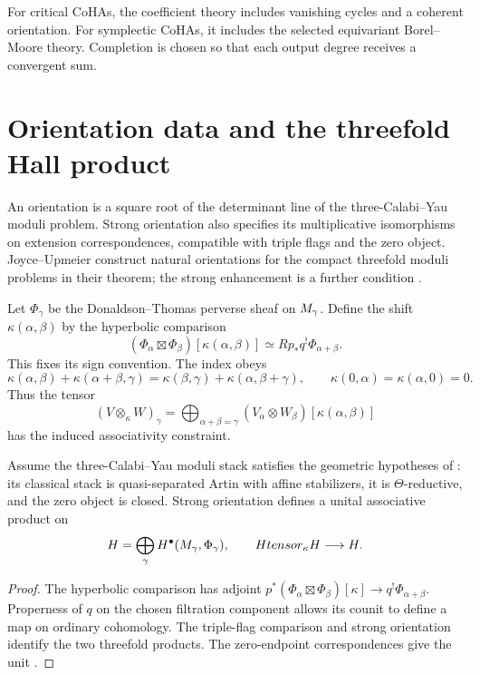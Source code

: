 For critical CoHAs, the coefficient theory includes vanishing cycles and a coherent orientation. For symplectic CoHAs, it includes the selected equivariant Borel--Moore theory. Completion is chosen so that each output degree receives a convergent sum.

\section{Orientation data and the threefold Hall product}
An orientation is a square root of the determinant line of the
three-Calabi--Yau moduli problem. Strong orientation also specifies its
multiplicative isomorphisms on extension correspondences, compatible
with triple flags and the zero object. Joyce--Upmeier construct natural
orientations for the compact threefold moduli problems in their theorem;
the strong enhancement is a further condition \cite{JoyceUpmeier,KPS}.

Let $\Phi_\gamma$ be the Donaldson--Thomas perverse sheaf on
$M_\gamma$. Define the shift $\kappa(\alpha,\beta)$ by the hyperbolic
comparison
\[
 (\Phi_\alpha\boxtimes\Phi_\beta)[\kappa(\alpha,\beta)]
       \simeq Rp_*q^!\Phi_{\alpha+\beta}.
\]
This fixes its sign convention. The index obeys
\[
 \kappa(\alpha,\beta)+\kappa(\alpha+\beta,\gamma)
 =\kappa(\beta,\gamma)+\kappa(\alpha,\beta+\gamma),
 \qquad \kappa(0,\alpha)=\kappa(\alpha,0)=0.
\]
Thus the tensor
\[
 (V\otimes_\kappa W)_\gamma
 =\bigoplus_{\alpha+\beta=\gamma}
       (V_\alpha\otimes W_\beta)[\kappa(\alpha,\beta)]
\]
has the induced associativity constraint.

\begin{theorem}
Assume the three-Calabi--Yau moduli stack satisfies the geometric
hypotheses of \cite[Theorem~8.6 and Corollary~8.8]{KPS}: its classical
stack is quasi-separated Artin with affine stabilizers, it is
$\Theta$-reductive, and the zero object is closed. Strong orientation
defines a unital associative product on
\[
 H=\bigoplus_\gamma H^\bullet(M_\gamma,\Phi_\gamma),
 \qquad Htensor_\kappa H\longrightarrow H.
\]
\end{theorem}
\begin{proof}
The hyperbolic comparison has adjoint
$p^*(\Phi_\alpha\boxtimes\Phi_\beta)[\kappa]\to
q^!\Phi_{\alpha+\beta}$. Properness of $q$ on the chosen filtration
component allows its counit to define a map on ordinary cohomology.
The triple-flag comparison and strong orientation identify the two
threefold products. The zero-endpoint correspondences give the unit
\cite[Proposition~8.29]{KPS}.
\end{proof}

